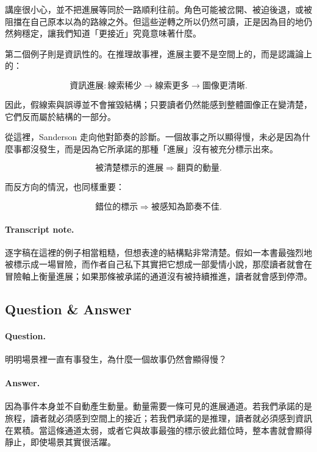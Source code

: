 講座很小心，並不把進展等同於一路順利往前。角色可能被岔開、被迫後退，或被阻擋在自己原本以為的路線之外。但這些逆轉之所以仍然可讀，正是因為目的地仍然夠穩定，讓我們知道「更接近」究竟意味著什麼。

第二個例子則是資訊性的。在推理故事裡，進展主要不是空間上的，而是認識論上的：

\begin{equation}
\text{資訊進展} : \text{線索稀少} \to \text{線索更多} \to \text{圖像更清晰}.
\end{equation}

因此，假線索與誤導並不會摧毀結構；只要讀者仍然能感到整體圖像正在變清楚，它們反而屬於結構的一部分。

從這裡，Sanderson 走向他對節奏的診斷。一個故事之所以顯得慢，未必是因為什麼事都沒發生，而是因為它所承諾的那種「進展」沒有被充分標示出來。

\begin{equation}
\text{被清楚標示的進展} \Rightarrow \text{翻頁的動量}.
\end{equation}

而反方向的情況，也同樣重要：

\begin{equation}
\text{錯位的標示} \Rightarrow \text{被感知為節奏不佳}.
\end{equation}

\paragraph{Transcript note.} 逐字稿在這裡的例子相當粗糙，但想表達的結構點非常清楚。假如一本書最強烈地被標示成一場冒險，而作者自己私下其實把它想成一部愛情小說，那麼讀者就會在冒險軸上衡量進展；如果那條被承諾的通道沒有被持續推進，讀者就會感到停滯。

\subsection{Question \& Answer}

\paragraph{Question.} 明明場景裡一直有事發生，為什麼一個故事仍然會顯得慢？

\paragraph{Answer.} 因為事件本身並不自動產生動量。動量需要一條可見的進展通道。若我們承諾的是旅程，讀者就必須感到空間上的接近；若我們承諾的是推理，讀者就必須感到資訊在累積。當這條通道太弱，或者它與故事最強的標示彼此錯位時，整本書就會顯得靜止，即使場景其實很活躍。

